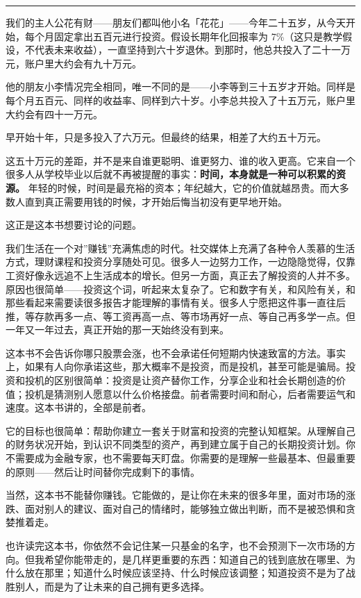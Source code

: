 \documentclass[a4paper,11pt,oneside,fontset=none,UTF8,zihao=-4]{ctexbook}
\begin{document}
\begin{center}{\color{dh-bronze}\rule{0.2\textwidth}{0.5pt}}\end{center}

我们的主人公花有财------朋友们都叫他小名「花花」------今年二十五岁，从今天开始，每个月固定拿出五百元进行投资。假设长期年化回报率为
7\%（这只是教学假设，不代表未来收益），一直坚持到六十岁退休。到那时，他总共投入了二十一万元，账户里大约会有九十万元。

他的朋友小李情况完全相同，唯一不同的是------小李等到三十五岁才开始。同样是每个月五百元、同样的收益率、同样到六十岁。小李总共投入了十五万元，账户里大约会有四十一万元。

早开始十年，只是多投入了六万元。但最终的结果，相差了大约五十万元。

这五十万元的差距，并不是来自谁更聪明、谁更努力、谁的收入更高。它来自一个很多人从学校毕业以后就不再被提醒的事实：\textbf{时间，本身就是一种可以积累的资源。}
年轻的时候，时间是最充裕的资本；年纪越大，它的价值就越昂贵。而大多数人直到真正需要用钱的时候，才开始后悔当初没有更早地开始。

这正是这本书想要讨论的问题。

我们生活在一个对''赚钱''充满焦虑的时代。社交媒体上充满了各种令人羡慕的生活方式，理财课程和投资分享随处可见。很多人一边努力工作，一边隐隐觉得，仅靠工资好像永远追不上生活成本的增长。但另一方面，真正去了解投资的人并不多。原因也很简单------投资这个词，听起来太复杂了。它和数字有关，和风险有关，和那些看起来需要读很多报告才能理解的事情有关。很多人宁愿把这件事一直往后推，等存款再多一点、等工资再高一点、等市场再好一点、等自己再多学一点。但一年又一年过去，真正开始的那一天始终没有到来。

这本书不会告诉你哪只股票会涨，也不会承诺任何短期内快速致富的方法。事实上，如果有人向你承诺这些，那大概率不是投资，而是投机，甚至可能是骗局。投资和投机的区别很简单：投资是让资产替你工作，分享企业和社会长期创造的价值；投机是猜测别人愿意以什么价格接盘。前者需要时间和耐心，后者需要运气和速度。这本书讲的，全部是前者。

它的目标也很简单：帮助你建立一套关于财富和投资的完整认知框架。从理解自己的财务状况开始，到认识不同类型的资产，再到建立属于自己的长期投资计划。你不需要成为金融专家，也不需要每天盯盘。你需要的是理解一些最基本、但最重要的原则------然后让时间替你完成剩下的事情。

当然，这本书不能替你赚钱。它能做的，是让你在未来的很多年里，面对市场的涨跌、面对别人的建议、面对自己的情绪时，能够独立做出判断，而不是被恐惧和贪婪推着走。

也许读完这本书，你依然不会记住某一只基金的名字，也不会预测下一次市场的方向。但我希望你能带走的，是几样更重要的东西：知道自己的钱到底放在哪里、为什么放在那里；知道什么时候应该坚持、什么时候应该调整；知道投资不是为了战胜别人，而是为了让未来的自己拥有更多选择。
\end{document}

